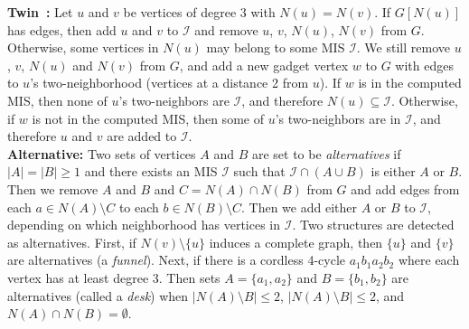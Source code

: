 \documentclass[twoside,leqno,twocolumn]{article}
\newif\ifFull
\begin{document}
\ifFull
\noindent\textbf{Twin:} This is a generalization of the vertex folding rule. Suppose there are two vertices $u$ and $v$ that have degree 3 and share the same neighborhood. If $u$'s neighborhood $N(u)$ induces a graph with edges, then $u$ and $v$ are added to the independent set and $u$, $v$, and their neighborhoods are removed from the graph. Otherwise, vertices in $N(u)$ may belong in the independent set. We still remove $u$, $v$, and their neighborhoods, and add a new gadget vertex $w$ to the graph with edges to $u$'s two-neighborhood (vertices at a distance 2 from $u$). If $w$ is in some MIS, none of $u$'s two-neighbors are in the independent set, and therefore $N(u)$ is part of the independent set. Otherwise, if $w$ is not in the MIS, then some of $u$'s two-neighbors are in the independent set, and therefore $u$ and $v$ are added to the independent set. Thus, the twin reduction adds an additional two vertices to the computed~independent~set. \\
\else
\noindent\textbf{Twin~\cite{Xiao201392}:} Let $u$ and $v$ be vertices of degree 3 with $N(u) = N(v)$. If $G[N(u)]$ has edges, then add $u$ and $v$ to $\mathcal{I}$ and remove $u$, $v$, $N(u)$, $N(v)$ from $G$. Otherwise, some vertices in $N(u)$ may belong to some MIS $\mathcal{I}$. We still remove $u$, $v$, $N(u)$ and $N(v)$ from $G$, and add a new gadget vertex $w$ to $G$ with edges to $u$'s two-neighborhood (vertices at a distance 2 from $u$). If $w$ is in the computed MIS, then none of $u$'s two-neighbors are $\mathcal{I}$, and therefore $N(u) \subseteq \mathcal{I}$. Otherwise, if $w$ is not in the computed MIS, then some of $u$'s two-neighbors are in $\mathcal{I}$, and therefore $u$ and $v$ are added to $\mathcal{I}$.\\
\fi

\noindent\textbf{Alternative:} Two sets of vertices $A$ and $B$ are set to be \emph{alternatives} if $|A| = |B| \geq 1$ and there exists an MIS $\mathcal{I}$ such that $\mathcal{I}\cap(A\cup B)$ is either $A$ or $B$. Then we remove $A$ and $B$ and $C = N(A)\cap N(B)$ from $G$ and add edges from each $a \in N(A)\setminus C$ to each $b\in N(B)\setminus C$.
Then we add either $A$ or $B$ to $\mathcal{I}$, depending on which neighborhood has vertices in $\mathcal{I}$. Two structures are detected as alternatives. First, if $N(v)\setminus \{u\}$ induces a complete graph, then $\{u\}$ and $\{v\}$ are alternatives (a \emph{funnel}). Next, if there is a cordless 4-cycle $a_1b_1a_2b_2$ where each vertex has at least degree 3. Then sets $A=\{a_1, a_2\}$ and $B=\{b_1, b_2\}$ are alternatives (called a \emph{desk}) when $|N(A) \setminus B| \leq 2$, $|N(A) \setminus B| \leq 2$, and $N(A) \cap N(B) = \emptyset$. 
\end{document}
